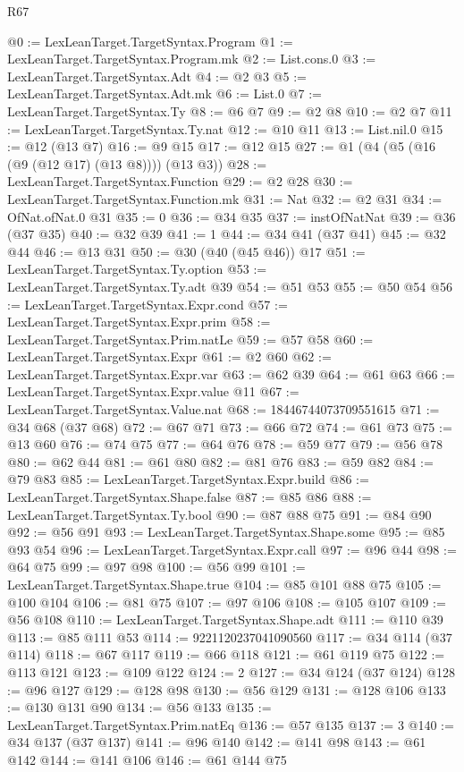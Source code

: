 \begin{lexlean}{R67}
\begin{coremodule}
@0 := LexLeanTarget.TargetSyntax.Program
@1 := LexLeanTarget.TargetSyntax.Program.mk
@2 := List.cons.{0}
@3 := LexLeanTarget.TargetSyntax.Adt
@4 := @2 @3
@5 := LexLeanTarget.TargetSyntax.Adt.mk
@6 := List.{0}
@7 := LexLeanTarget.TargetSyntax.Ty
@8 := @6 @7
@9 := @2 @8
@10 := @2 @7
@11 := LexLeanTarget.TargetSyntax.Ty.nat
@12 := @10 @11
@13 := List.nil.{0}
@15 := @12 (@13 @7)
@16 := @9 @15
@17 := @12 @15
@27 := @1 (@4 (@5 (@16 (@9 (@12 @17) (@13 @8)))) (@13 @3))
@28 := LexLeanTarget.TargetSyntax.Function
@29 := @2 @28
@30 := LexLeanTarget.TargetSyntax.Function.mk
@31 := Nat
@32 := @2 @31
@34 := OfNat.ofNat.{0} @31
@35 := 0
@36 := @34 @35
@37 := instOfNatNat
@39 := @36 (@37 @35)
@40 := @32 @39
@41 := 1
@44 := @34 @41 (@37 @41)
@45 := @32 @44
@46 := @13 @31
@50 := @30 (@40 (@45 @46)) @17
@51 := LexLeanTarget.TargetSyntax.Ty.option
@53 := LexLeanTarget.TargetSyntax.Ty.adt @39
@54 := @51 @53
@55 := @50 @54
@56 := LexLeanTarget.TargetSyntax.Expr.cond
@57 := LexLeanTarget.TargetSyntax.Expr.prim
@58 := LexLeanTarget.TargetSyntax.Prim.natLe
@59 := @57 @58
@60 := LexLeanTarget.TargetSyntax.Expr
@61 := @2 @60
@62 := LexLeanTarget.TargetSyntax.Expr.var
@63 := @62 @39
@64 := @61 @63
@66 := LexLeanTarget.TargetSyntax.Expr.value @11
@67 := LexLeanTarget.TargetSyntax.Value.nat
@68 := 18446744073709551615
@71 := @34 @68 (@37 @68)
@72 := @67 @71
@73 := @66 @72
@74 := @61 @73
@75 := @13 @60
@76 := @74 @75
@77 := @64 @76
@78 := @59 @77
@79 := @56 @78
@80 := @62 @44
@81 := @61 @80
@82 := @81 @76
@83 := @59 @82
@84 := @79 @83
@85 := LexLeanTarget.TargetSyntax.Expr.build
@86 := LexLeanTarget.TargetSyntax.Shape.false
@87 := @85 @86
@88 := LexLeanTarget.TargetSyntax.Ty.bool
@90 := @87 @88 @75
@91 := @84 @90
@92 := @56 @91
@93 := LexLeanTarget.TargetSyntax.Shape.some
@95 := @85 @93 @54
@96 := LexLeanTarget.TargetSyntax.Expr.call
@97 := @96 @44
@98 := @64 @75
@99 := @97 @98
@100 := @56 @99
@101 := LexLeanTarget.TargetSyntax.Shape.true
@104 := @85 @101 @88 @75
@105 := @100 @104
@106 := @81 @75
@107 := @97 @106
@108 := @105 @107
@109 := @56 @108
@110 := LexLeanTarget.TargetSyntax.Shape.adt
@111 := @110 @39
@113 := @85 @111 @53
@114 := 9221120237041090560
@117 := @34 @114 (@37 @114)
@118 := @67 @117
@119 := @66 @118
@121 := @61 @119 @75
@122 := @113 @121
@123 := @109 @122
@124 := 2
@127 := @34 @124 (@37 @124)
@128 := @96 @127
@129 := @128 @98
@130 := @56 @129
@131 := @128 @106
@133 := @130 @131 @90
@134 := @56 @133
@135 := LexLeanTarget.TargetSyntax.Prim.natEq
@136 := @57 @135
@137 := 3
@140 := @34 @137 (@37 @137)
@141 := @96 @140
@142 := @141 @98
@143 := @61 @142
@144 := @141 @106
@146 := @61 @144 @75

\end{coremodule}
\end{lexlean}
